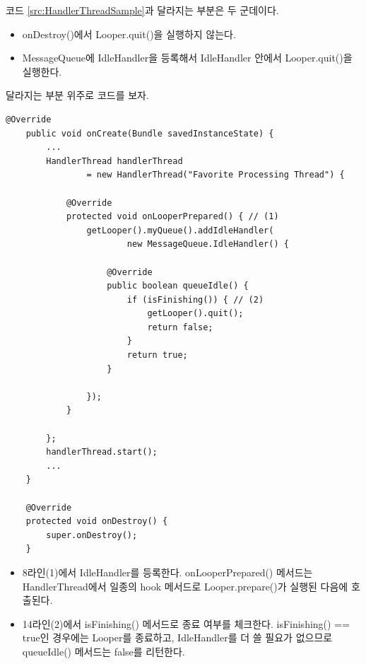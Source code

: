 코드 \ref{src:HandlerThreadSample}과 달라지는 부분은 두 군데이다.
\begin{itemize}
\item onDestroy()에서 Looper.quit()을 실행하지 않는다.
\item MessageQueue에 IdleHandler을 등록해서 IdleHandler 안에서 Looper.quit()을 실행한다.
\end{itemize}

달라지는 부분 위주로 코드를 보자.
\begin{lstlisting}[frame=single, caption=Handler 스레드 사용 예제(Fixed), label=src:HandlerThreadSample2] 
 	@Override
    public void onCreate(Bundle savedInstanceState) {
    	...
        HandlerThread handlerThread
                = new HandlerThread("Favorite Processing Thread") {

            @Override
            protected void onLooperPrepared() { // (1)
                getLooper().myQueue().addIdleHandler(
                		new MessageQueue.IdleHandler() {

                    @Override
                    public boolean queueIdle() {
                        if (isFinishing()) { // (2)
                            getLooper().quit();
                            return false;
                        }
                        return true;
                    }

                });
            }

        };
        handlerThread.start();
        ...
	}
	
	@Override
    protected void onDestroy() {
        super.onDestroy();
    }
\end{lstlisting}

\begin{itemize}
\item 8라인(1)에서 IdleHandler를 등록한다. onLooperPrepared() 메서드는 HandlerThread에서 일종의 hook 메서드로 Looper.prepare()가 실행된 다음에 호출된다.
\item 14라인(2)에서 isFinishing() 메서드로 종료 여부를 체크한다. isFinishing() == true인 경우에는 Looper를 종료하고, IdleHandler를 더 쓸 필요가 없으므로 queueIdle() 메서드는 false를 리턴한다.
\end{itemize}

